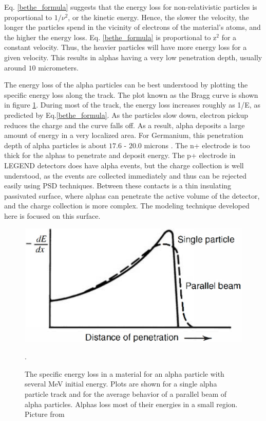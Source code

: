 Eq. \ref{bethe_formula} suggests that the energy loss for non-relativistic particles is proportional to $1/\nu^2$, or the kinetic energy. Hence, the slower the velocity, the longer the particles spend in the vicinity of electrons of the material's atoms, and the higher the energy loss. Eq. \ref{bethe_formula} is proportional to z$^2$ for a constant velocity. Thus, the heavier particles will have more energy loss for a given velocity. This results in alphas having a very low penetration depth, usually around $10$ micrometers.

The energy loss of the alpha particles can be best understood by plotting the specific energy loss along the track. The plot known as the Bragg curve is shown in figure \ref{bragg_curve_fig}. During most of the track, the energy loss increases roughly as 1/E, as predicted by Eq.\ref{bethe_formula}. As the particles slow down, electron pickup reduces the charge and the curve falls off. As a result, alpha deposits a large amount of energy in a very localized area. For Germanium, this penetration depth of alpha particles is about $17.6$ - $20.0$ microns \cite{knoll_2010}. The n+ electrode is too thick for the alphas to penetrate and deposit energy. The p+ electrode in LEGEND detectors does have alpha events, but the charge collection is well understood, as the events are collected immediately and thus can be rejected easily using PSD techniques. Between these contacts is a thin insulating passivated surface, where alphas can penetrate the active volume of the detector, and the charge collection is more complex. The modeling technique developed here is focused on this surface.

\begin{figure}
\centering
\includegraphics[width=0.5\linewidth]{ch3/figs/bragg_curve.png}
\caption{The specific energy loss in a material for an alpha particle with several MeV initial energy. Plots are shown for a single alpha particle track and for the average behavior of a parallel beam of alpha particles. Alphas loss most of their energies in a small region. Picture from \cite{knoll_2010}}. 
\label{bragg_curve_fig}
\end{figure}

